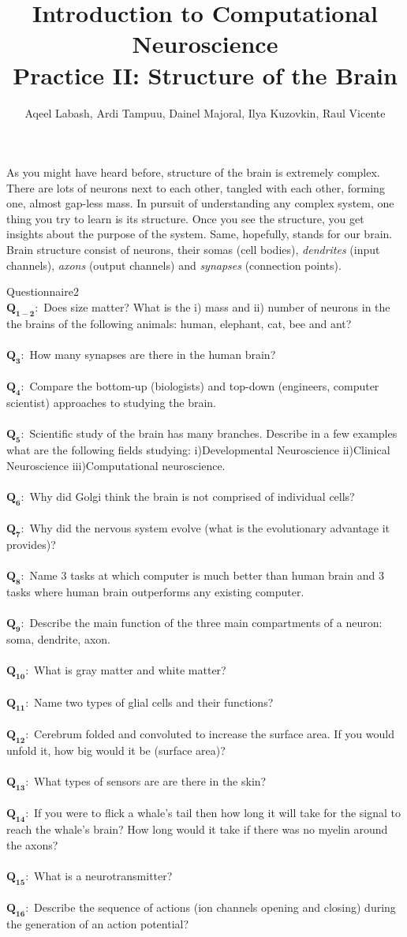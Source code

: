 \documentclass[a4paper,11pt]{article}
\author{\large{Aqeel Labash, Ardi Tampuu, Dainel Majoral, Ilya Kuzovkin, Raul Vicente}}
\title{\huge{Introduction to Computational Neuroscience}\\\LARGE{Practice II: Structure of the Brain}}
\newcommand{\question}[2]{\setlength\parindent{0mm}\ \\$\mathbf{Q_{#1}:}$ #2\ \\}
\begin{document}
\maketitle

As you might have heard before, structure of the brain is extremely complex. There are lots of neurons next to each other, tangled with each other, forming one, almost gap-less mass. In pursuit of understanding any complex system, one thing you try to learn is its structure. Once you see the structure, you get insights about the purpose of the system. Same, hopefully, stands for our brain. Brain structure consist of neurons, their somas (cell bodies), \emph{dendrites} (input channels), \emph{axons} (output channels) and \emph{synapses} (connection points). 


%
%
\begin{exercise}{1}{Questionnaire}{2}
\question{1-2}{Does size matter? What is the i) mass and ii) number of neurons in the the brains of the following animals: human, elephant, cat, bee and ant?}
\question{3}{How many synapses are there in the human brain?}
\question{4}{Compare the bottom-up (biologists) and top-down (engineers, computer scientist) approaches to studying the brain.}
\question{5}{Scientific study of the brain has many branches. Describe in a few examples what are the following fields studying: i)Developmental Neuroscience ii)Clinical Neuroscience iii)Computational neuroscience.}
\question{6}{Why did Golgi think the brain is not comprised of individual cells?}
\question{7}{Why did the nervous system evolve (what is the evolutionary advantage it provides)?}
\question{8}{Name 3 tasks at which computer is much better than human brain and 3 tasks where human brain outperforms any existing computer.}
\question{9}{Describe the main function of the three main compartments of a neuron: soma, dendrite, axon.}
\question{10}{What is gray matter and white matter?}
\question{11}{Name two types of glial cells and their functions?}
\question{12}{Cerebrum folded and convoluted to increase the surface area. If you would unfold it, how big would it be (surface area)?}
\question{13}{What types of sensors are are there in the skin?}
\question{14}{If you were to flick a whale's tail then how long it will take for the signal to reach the whale's brain? How long would it take if there was no myelin around the axons?}
\question{15}{What is a neurotransmitter?}
\question{16}{Describe the sequence of actions (ion channels opening and closing) during the generation of an action potential?}
\end{exercise}
\end{document}
